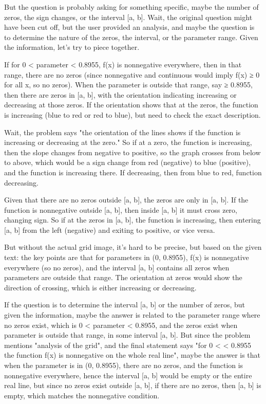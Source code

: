 But the question is probably asking for something specific, maybe the number of zeros, the sign changes, or the interval [a, b]. Wait, the original question might have been cut off, but the user provided an analysis, and maybe the question is to determine the nature of the zeros, the interval, or the parameter range. Given the information, let's try to piece together. 

If for 0 < parameter < 0.8955, f(x) is nonnegative everywhere, then in that range, there are no zeros (since nonnegative and continuous would imply f(x) ≥ 0 for all x, so no zeros). When the parameter is outside that range, say ≥ 0.8955, then there are zeros in [a, b], with the orientation indicating increasing or decreasing at those zeros. If the orientation shows that at the zeros, the function is increasing (blue to red or red to blue), but need to check the exact description. 

Wait, the problem says "the orientation of the lines shows if the function is increasing or decreasing at the zero." So if at a zero, the function is increasing, then the slope changes from negative to positive, so the graph crosses from below to above, which would be a sign change from red (negative) to blue (positive), and the function is increasing there. If decreasing, then from blue to red, function decreasing. 

Given that there are no zeros outside [a, b], the zeros are only in [a, b]. If the function is nonnegative outside [a, b], then inside [a, b] it must cross zero, changing sign. So if at the zeros in [a, b], the function is increasing, then entering [a, b] from the left (negative) and exiting to positive, or vice versa. 

But without the actual grid image, it's hard to be precise, but based on the given text: the key points are that for parameters in (0, 0.8955), f(x) is nonnegative everywhere (so no zeros), and the interval [a, b] contains all zeros when parameters are outside that range. The orientation at zeros would show the direction of crossing, which is either increasing or decreasing. 

If the question is to determine the interval [a, b] or the number of zeros, but given the information, maybe the answer is related to the parameter range where no zeros exist, which is 0 < parameter < 0.8955, and the zeros exist when parameter is outside that range, in some interval [a, b]. But since the problem mentions "analysis of the grid", and the final statement says "for 0 < < 0.8955 the function f(x) is nonnegative on the whole real line", maybe the answer is that when the parameter is in (0, 0.8955), there are no zeros, and the function is nonnegative everywhere, hence the interval [a, b] would be empty or the entire real line, but since no zeros exist outside [a, b], if there are no zeros, then [a, b] is empty, which matches the nonnegative condition. 

